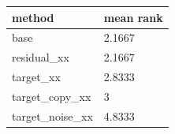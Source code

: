 \begin{tabular}{ll}
\toprule
method & mean rank \\
\midrule
base & 2.1667 \\
residual\_xx & 2.1667 \\
target\_xx & 2.8333 \\
target\_copy\_xx & 3 \\
target\_noise\_xx & 4.8333 \\
\bottomrule
\end{tabular}
